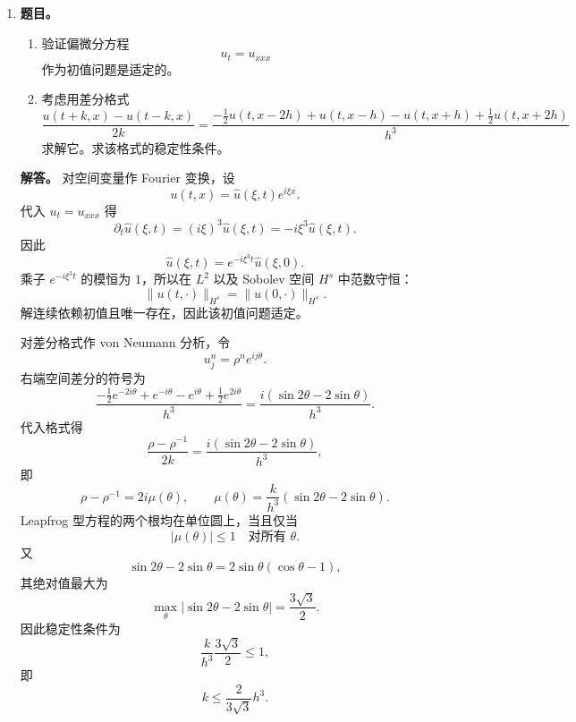﻿\documentclass[UTF8,12pt]{ctexart}
\begin{document}
\begin{enumerate}[label=\textbf{\arabic*.},leftmargin=2.2em]
设
\[
M=\|a\|_{L^\infty(0,1)}.
\]
第 \(i\) 行的 Gershgorin 圆盘中心为
\[
c_i=\frac{a_{i-1/2}+a_{i+1/2}}{h^2},
\]
半径为
\[
r_i=\frac{a_{i-1/2}+a_{i+1/2}}{h^2}=c_i.
\]
因为 \(0<a_{i\pm1/2}\le M\)，故 \(0<c_i\le2M/h^2\)，且每个 Gershgorin 圆盘都包含在
\[
\{z\in\mathbb C:\ |z|\le 4M/h^2\}.
\]
因此
\[
\lambda(A)\subset \{z\in\mathbb C:\ |z|\le 4M/h^2\}.
\]
这给出了只依赖 \(M\) 与 \(h\) 的保证圆盘。

\item \textbf{题目。}
\begin{enumerate}[label=(\alph*),leftmargin=2.0em]
\item 验证偏微分方程
\[
u_t=u_{xxx}
\]
作为初值问题是适定的。
\item 考虑用差分格式
\[
\frac{u(t+k,x)-u(t-k,x)}{2k}
=\frac{-\frac12u(t,x-2h)+u(t,x-h)-u(t,x+h)+\frac12u(t,x+2h)}{h^3}
\]
求解它。求该格式的稳定性条件。
\end{enumerate}

\textbf{解答。} 对空间变量作 Fourier 变换，设
\[
u(t,x)=\widehat u(\xi,t)e^{i\xi x}.
\]
代入 \(u_t=u_{xxx}\) 得
\[
\partial_t\widehat u(\xi,t)=(i\xi)^3\widehat u(\xi,t)
=-i\xi^3\widehat u(\xi,t).
\]
因此
\[
\widehat u(\xi,t)=e^{-i\xi^3t}\widehat u(\xi,0).
\]
乘子 \(e^{-i\xi^3t}\) 的模恒为 \(1\)，所以在 \(L^2\) 以及 Sobolev 空间 \(H^s\) 中范数守恒：
\[
\|u(t,\cdot)\|_{H^s}=\|u(0,\cdot)\|_{H^s}.
\]
解连续依赖初值且唯一存在，因此该初值问题适定。

对差分格式作 von Neumann 分析，令
\[
u_j^n=\rho^n e^{ij\theta}.
\]
右端空间差分的符号为
\[
\frac{-\frac12e^{-2i\theta}+e^{-i\theta}-e^{i\theta}+\frac12e^{2i\theta}}{h^3}
=\frac{i(\sin2\theta-2\sin\theta)}{h^3}.
\]
代入格式得
\[
\frac{\rho-\rho^{-1}}{2k}
=\frac{i(\sin2\theta-2\sin\theta)}{h^3},
\]
即
\[
\rho-\rho^{-1}=2i\mu(\theta),
\qquad
\mu(\theta)=\frac{k}{h^3}(\sin2\theta-2\sin\theta).
\]
Leapfrog 型方程的两个根均在单位圆上，当且仅当
\[
|\mu(\theta)|\le1
\quad\text{对所有 }\theta.
\]
又
\[
\sin2\theta-2\sin\theta
=2\sin\theta(\cos\theta-1),
\]
其绝对值最大为
\[
\max_\theta|\sin2\theta-2\sin\theta|
=\frac{3\sqrt3}{2}.
\]
因此稳定性条件为
\[
\frac{k}{h^3}\frac{3\sqrt3}{2}\le1,
\]
即
\[
k\le \frac{2}{3\sqrt3}h^3.
\]


\end{enumerate}
\end{document}
